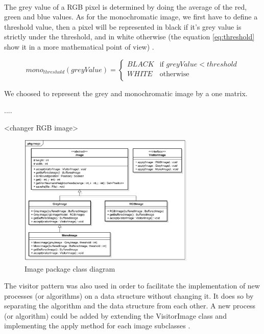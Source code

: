 ~~

The grey value of a RGB pixel is determined by doing the average of the red, green and blue values. As for the monochromatic image, we first have to define a 
threshold value, then a pixel will be represented in black if it's grey value is strictly under the threshold, and in white otherwise (the equation \ref{eq:threshold} show it in a more mathematical point of view) \cite{bib:image:Threshold}.

\begin{equation} \label{eq:threshold}
mono_{threshold}(greyValue) = 
	\begin{cases}
		BLACK & \text{if } greyValue < threshold \\
		WHITE & \text{otherwise} \\ 
	\end{cases}
\end{equation}


We choosed to represent the grey and monochromatic image by a one matrix. 


.... 



<changer RGB image> 

\begin{figure}
	\centering 
	\includegraphics[width=0.75\textwidth]{images/diagrams/class_diagram_image}
	\caption{Image package class diagram}
	\label{fig:diagram:class:image}
\end{figure}


The visitor pattern was also used in order to facilitate the implementation of new processes (or algorithms) on a data structure without changing it. It does so by separating the algorithm and the data structure from each other. A new process (or algorithm) could be added by extending the VisitorImage class and implementing the apply method for each image subclasses \cite{bib:pattern:Visitor}. 

